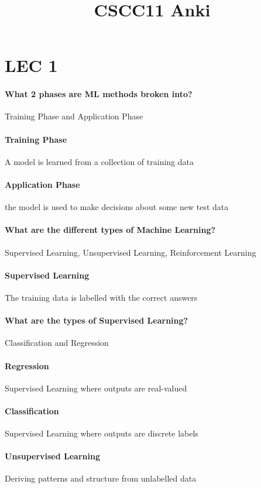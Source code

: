 \documentclass[12pt]{article}
\begin{document}
\title{CSCC11 Anki}
\maketitle

\section{LEC 1}

\paragraph{What 2 phases are ML methods broken into?} Training Phase and Application Phase
\paragraph{Training Phase} A model is learned from a collection of training data
\paragraph{Application Phase} the model is used to make decisions about some new test data

\paragraph{What are the different types of Machine Learning?} Supervised Learning, Unsupervised Learning, Reinforcement Learning
\paragraph{Supervised Learning} The training data is labelled with the correct answers
\paragraph{What are the types of Supervised Learning?} Classification and Regression
\paragraph{Regression} Supervised Learning where outputs are real-valued
\paragraph{Classification} Supervised Learning where outputs are discrete labels
\paragraph{Unsupervised Learning} Deriving patterns and structure from unlabelled data
\end{document}
